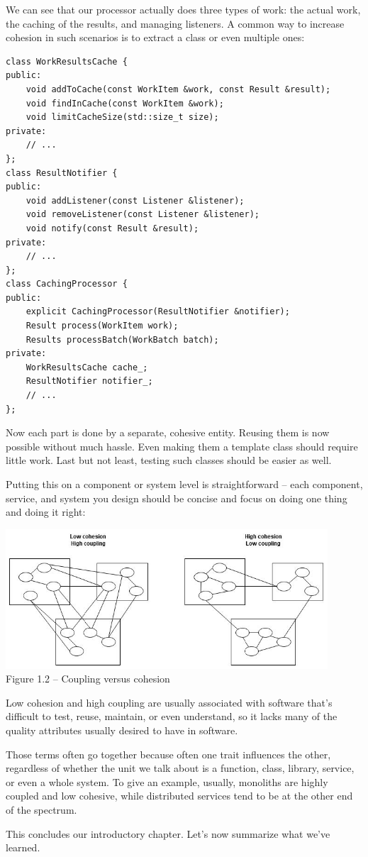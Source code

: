 We can see that our processor actually does three types of work: the actual work, the caching of the results, and managing listeners. A common way to increase cohesion in such scenarios is to extract a class or even multiple ones:


\begin{lstlisting}[style=styleCXX]
class WorkResultsCache {
public:
	void addToCache(const WorkItem &work, const Result &result);
	void findInCache(const WorkItem &work);
	void limitCacheSize(std::size_t size);
private:
	// ...
};
class ResultNotifier {
public:
	void addListener(const Listener &listener);
	void removeListener(const Listener &listener);
	void notify(const Result &result);
private:
	// ...
};
class CachingProcessor {
public:
	explicit CachingProcessor(ResultNotifier &notifier);
	Result process(WorkItem work);
	Results processBatch(WorkBatch batch);
private:
	WorkResultsCache cache_;
	ResultNotifier notifier_;
	// ...
};

\end{lstlisting}

Now each part is done by a separate, cohesive entity. Reusing them is now possible without much hassle. Even making them a template class should require little work. Last but not least, testing such classes should be easier as well.

Putting this on a component or system level is straightforward – each component, service, and system you design should be concise and focus on doing one thing and doing it right:


\begin{center}
\includegraphics[width=0.9\textwidth]{content/1/chapter1/images/2.jpg}\\
Figure 1.2 – Coupling versus cohesion
\end{center}

Low cohesion and high coupling are usually associated with software that's difficult to test, reuse, maintain, or even understand, so it lacks many of the quality attributes usually desired to have in software.

Those terms often go together because often one trait influences the other, regardless of whether the unit we talk about is a function, class, library, service, or even a whole system. To give an example, usually, monoliths are highly coupled and low cohesive, while distributed services tend to be at the other end of the spectrum. 

This concludes our introductory chapter. Let's now summarize what we've learned.